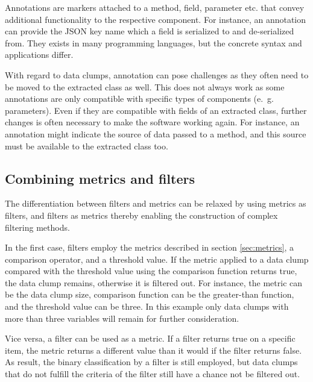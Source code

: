 Annotations are markers attached to a method, field, parameter etc. that convey additional functionality to the respective component. For instance, an annotation can provide the \ac{JSON} key name which a field is serialized to and de-serialized from.  They exists in many programming languages, but the concrete syntax and applications differ.

With regard to data clumps, annotation can pose challenges as they often need to be moved to the extracted class as well. This does not always work as some annotations are only compatible with specific types of components (e.~g. parameters). Even if they are compatible with fields of an extracted class, further changes is often necessary to make the software working again. For instance, an annotation might indicate the source of data passed to a method, and this source must be available to the extracted class too. 

\subsection{Combining metrics and filters}

The differentiation between filters and metrics can be relaxed by using metrics as filters, and filters as metrics thereby enabling the construction of complex filtering methods. 

In the first case, filters employ the metrics described in section \ref{sec:metrics}, a comparison operator, and a threshold value. If the metric applied to a data clump compared with the threshold value using the comparison function returns true, the data clump remains, otherwise it is filtered out. For instance, the metric can be the data clump size, comparison function can be the greater-than function, and the threshold value can be three. In this example only data clumps with more than three variables will remain for further consideration. 

Vice versa, a filter can be used as a metric. If a filter returns true on a specific item, the metric returns a different value than it would if the filter returns false. As result, the binary classification by a filter is still employed, but data clumps that do not fulfill the criteria of the filter still have a chance not be filtered out. 

